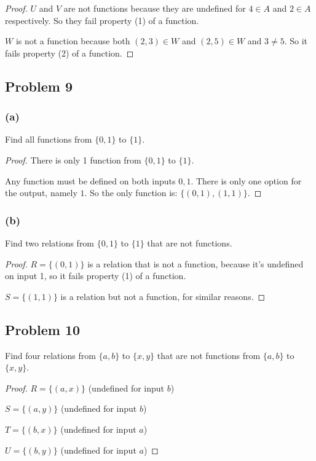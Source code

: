 \documentclass[14pt]{extarticle}
\begin{document}
\begin{proof}
$U$ and $V$ are not functions because they are undefined for $4 \in A$ and
$2 \in A$ respectively. So they fail property (1) of a function.

$W$ is not a function because both $(2, 3) \in W$ and $(2, 5) \in W$ and
$3 \neq 5$. So it fails property (2) of a function.
\end{proof}

\subsection{Problem 9}

\subsubsection{(a)}
Find all functions from $\{0, 1\}$ to $\{1\}$.

\begin{proof}
There is only 1 function from $\{0, 1\}$ to $\{1\}$.

Any function must be defined on both inputs $0, 1$. There is only one option for
the output, namely $1$. So the only function is: $\{(0, 1), (1, 1)\}$.
\end{proof}

\subsubsection{(b)}
Find two relations from $\{0, 1\}$ to $\{1\}$ that are not functions.

\begin{proof}
$R = \{(0, 1)\}$ is a relation that is not a function, because it's undefined
on input 1, so it fails property (1) of a function.

$S = \{(1, 1)\}$ is a relation but not a function, for similar reasons.
\end{proof}

\subsection{Problem 10}
Find four relations from $\{a, b\}$ to $\{x, y\}$ that are not functions from
$\{a, b\}$ to $\{x, y\}$.

\begin{proof}
$R = \{(a, x)\}$ (undefined for input $b$)

$S = \{(a, y)\}$ (undefined for input $b$)

$T = \{(b, x)\}$ (undefined for input $a$)

$U = \{(b, y)\}$ (undefined for input $a$)
\end{proof}
\end{document}
